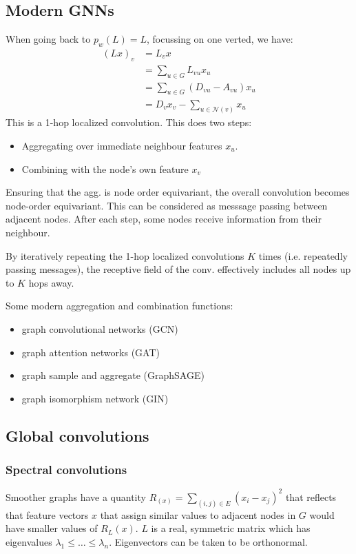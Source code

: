 \documentclass[12pt]{article}
\begin{document}
\subsection{Modern GNNs}
\label{sec:org7f35622}
When going back to \(p_w(L)=L\), focussing on one verted, we have:
   \begin{align*}
(Lx)_v &= L_v x\\
&= \sum_{u\in G}L_{vu}x_u\\
&= \sum_{u\in G}(D_{vu}-A_{vu})x_u\\
&= D_vx_v-\sum_{u\in\mathcal{N}(v)}x_u
   \end{align*}
This is a 1-hop localized convolution. This does two steps:
\begin{itemize}
\item Aggregating over immediate neighbour features \(x_u\).
\item Combining with the node's own feature \(x_v\)
\end{itemize}
Ensuring that the agg. is node order equivariant, the overall convolution
becomes node-order equivariant. This can be considered as messsage passing
between adjacent nodes. After each step, some nodes receive information from
their neighbour.

By iteratively repeating the 1-hop localized convolutions \(K\) times (i.e.
repeatedly passing messages), the receptive field of the conv. effectively
includes all nodes up to \(K\) hops away.

Some modern aggregation and combination functions:
\begin{itemize}
\item graph convolutional networks (GCN)
\item graph attention networks (GAT)
\item graph sample and aggregate (GraphSAGE)
\item graph isomorphism network (GIN)
\end{itemize}
\subsection{Global convolutions}
\label{sec:org53bb139}
\subsubsection{Spectral convolutions}
\label{sec:orgda3d05d}
Smoother graphs have a quantity \(R_(x)=\sum_{(i,j)\in E}(x_i-x_j)^2\) that
reflects that feature vectors \(x\) that assign similar values to adjacent
nodes in \(G\) would have smaller values of \(R_L(x)\). \(L\) is a real, symmetric
matrix which has eigenvalues \(\lambda_1\leq\dots\leq\lambda_n\). Eigenvectors
can be taken to be orthonormal.
\end{document}
